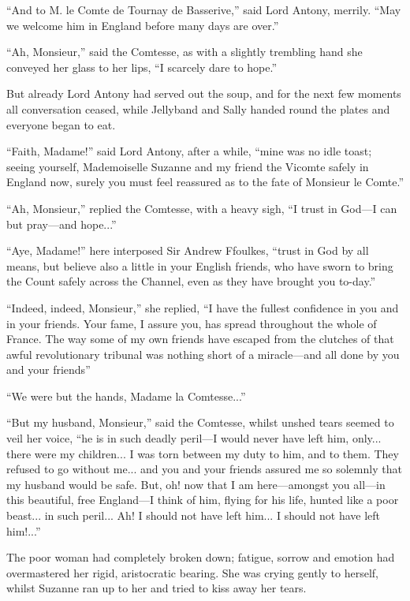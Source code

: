 \enquote{And to M. le Comte de Tournay de Basserive,} said Lord Antony, merrily. \enquote{May we welcome him in England before many days are over.}

\enquote{Ah, Monsieur,} said the Comtesse, as with a slightly trembling hand she conveyed her glass to her lips, \enquote{I scarcely dare to hope.}

But already Lord Antony had served out the soup, and for the next few moments all conversation ceased, while Jellyband and Sally handed round the plates and everyone began to eat.

\enquote{Faith, Madame!} said Lord Antony, after a while, \enquote{mine was no idle toast; seeing yourself, Mademoiselle Suzanne and my friend the Vicomte safely in England now, surely you must feel reassured as to the fate of Monsieur le Comte.}

\enquote{Ah, Monsieur,} replied the Comtesse, with a heavy sigh, \enquote{I trust in God---I can but pray---and hope...}

\enquote{Aye, Madame!} here interposed Sir Andrew Ffoulkes, \enquote{trust in God by all means, but believe also a little in your English friends, who have sworn to bring the Count safely across the Channel, even as they have brought you to-day.}

\enquote{Indeed, indeed, Monsieur,} she replied, \enquote{I have the fullest confidence in you and in your friends. Your fame, I assure you, has spread throughout the whole of France. The way some of my own friends have escaped from the clutches of that awful revolutionary tribunal was nothing short of a miracle---and all done by you and your  friends\longdash}

\enquote{We were but the hands, Madame la Comtesse...}

\enquote{But my husband, Monsieur,} said the Comtesse, whilst unshed tears seemed to veil her voice, \enquote{he is in such deadly peril---I would never have left him, only... there were my children... I was torn between my duty to him, and to them. They refused to go without me... and you and your friends assured me so solemnly that my husband would be safe. But, oh! now that I am here---amongst you all---in this beautiful, free England---I think of him, flying for his life, hunted like a poor beast... in such peril... Ah! I should not have left him... I should not have left him!...}

The poor woman had completely broken down; fatigue, sorrow and emotion had overmastered her rigid, aristocratic bearing. She was crying gently to herself, whilst Suzanne ran up to her and tried to kiss away her tears.


